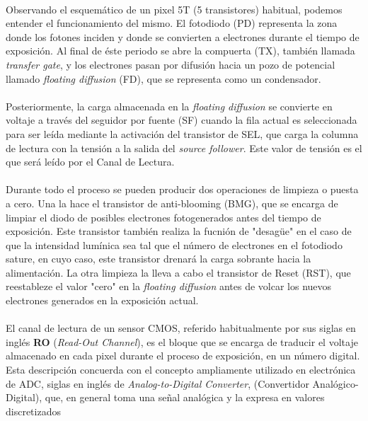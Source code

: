 \paragraph{}
Observando el esquemático de un pixel 5T (5 transistores) habitual, podemos entender
el funcionamiento del mismo. El fotodiodo (PD) representa la zona donde los fotones
inciden y donde se convierten a electrones durante el tiempo de exposición. Al final
de éste periodo se abre la compuerta (TX), también llamada \textit{transfer gate},
y los electrones pasan por difusión hacia un pozo de potencial llamado \textit{floating
diffusion} (FD), que se representa como un condensador.

\paragraph{}
Posteriormente, la carga almacenada en la \textit{floating diffusion} se convierte
en voltaje a través del seguidor por fuente (SF) cuando la fila actual es seleccionada
para ser leída mediante la activación del transistor de SEL, que carga la columna
de lectura con la tensión a la salida del \textit{source follower}. Este valor de
tensión es el que será leído por el Canal de Lectura.

\paragraph{}
Durante todo el proceso
se pueden producir dos operaciones de limpieza o puesta a cero. Una la hace el
transistor de anti-blooming (BMG), que se encarga de limpiar el diodo de posibles
electrones fotogenerados antes del tiempo de exposición. Este transistor también
realiza la fucnión de "desagüe" en el caso de que la intensidad lumínica sea tal
que el número de electrones en el fotodiodo sature, en cuyo caso, este transistor
drenará la carga sobrante hacia la alimentación. La otra limpieza la
lleva a cabo el transistor de Reset (RST), que reestableze el valor "cero" en la
 \textit{floating diffusion} antes de volcar los nuevos electrones generados en
 la exposición actual.




\paragraph{}
El canal de lectura de un sensor CMOS, referido habitualmente por sus
siglas en inglés \textbf{RO} (\textit{Read-Out Channel}), es el bloque que se
encarga de traducir el voltaje almacenado en cada pixel durante el proceso
de exposición, en un número digital. Esta descripción concuerda con el concepto
ampliamente utilizado en electrónica de ADC, siglas en inglés de \textit{Analog-to-Digital
Converter}, (Convertidor Analógico-Digital), que, en general toma una señal
analógica y la expresa en valores discretizados
